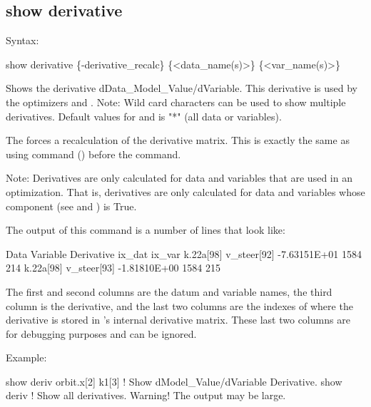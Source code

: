 {{{{{{{{%

\subsection{show derivative}
\label{s:show.derivative}

Syntax:
\begin{example}
  show derivative \{-derivative_recalc\} \{<data_name(s)>\} \{<var_name(s)>\}
\end{example}

Shows the derivative dData_Model_Value/dVariable. This derivative is used by the optimizers
 and . Note: Wild card characters can be used to show multiple derivatives.
Default values for  and  is "*" (all data or variables).

The  forces a recalculation of the derivative matrix. This is exactly the
same as using  command () before the  command.

Note: Derivatives are only calculated for data and variables that are used in an optimization. That
is, derivatives are only calculated for data and variables whose  component (see
 and ) is True.

The output of this command is a number of lines that look like:
\begin{example}
  Data                Variable               Derivative   ix_dat  ix_var
  k.22a[98]           v_steer[92]           -7.63151E+01    1584     214
  k.22a[98]           v_steer[93]           -1.81810E+00    1584     215
\end{example}
The first and second columns are the datum and variable names, the third column is the derivative,
and the last two columns are the indexes of where the derivative is stored in \tao's internal
derivative matrix. These last two columns are for debugging purposes and can be ignored.

Example:
\begin{example}
  show deriv orbit.x[2] k1[3] ! Show dModel_Value/dVariable Derivative.
  show deriv                  ! Show all derivatives. Warning! The output may be large.

\end{example}


}}}}}}}}
